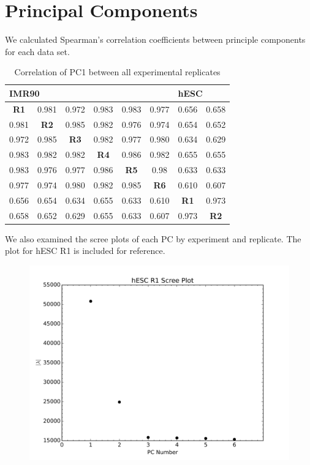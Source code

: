 \newpage
\section*{Principal Components}

We calculated Spearman's correlation coefficients between principle components for each data set.

\begin{table}[h]
  \centering
  \caption{Correlation of PC1 between all experimental replicates}\label{table:PC1Correlations}
  \begin{tabularx}{\textwidth}{@{}cccccccc@{}}
    \toprule
    \multicolumn{6}{l}{IMR90} & \multicolumn{2}{l}{hESC} \\
    \midrule
    \textbf{R1} & 0.981       & 0.972       & 0.983       & 0.983       & 0.977       & 0.656       & 0.658 \\
    0.981       & \textbf{R2} & 0.985       & 0.982       & 0.976       & 0.974       & 0.654       & 0.652 \\
    0.972       & 0.985       & \textbf{R3} & 0.982       & 0.977       & 0.980       & 0.634       & 0.629 \\
    0.983       & 0.982       & 0.982       & \textbf{R4} & 0.986       & 0.982       & 0.655       & 0.655 \\
    0.983       & 0.976       & 0.977       & 0.986       & \textbf{R5} & 0.98        & 0.633       & 0.633 \\
    0.977       & 0.974       & 0.980       & 0.982       & 0.985       & \textbf{R6} & 0.610       & 0.607 \\
    0.656       & 0.654       & 0.634       & 0.655       & 0.633       & 0.610       & \textbf{R1} & 0.973  \\
    0.658       & 0.652       & 0.629       & 0.655       & 0.633       & 0.607       & 0.973       & \textbf{R2}    \\
    \bottomrule
  \end{tabularx}
\end{table}

We also examined the scree plots of each \gls{PC} by experiment and replicate.  The plot for hESC R1 is included for reference.

\begin{figure}
  \centering
  \includegraphics[width=\textwidth]{./figures/supplementary/hESC-R1-scree.png}\label{fig:hESCScree}
\end{figure}
